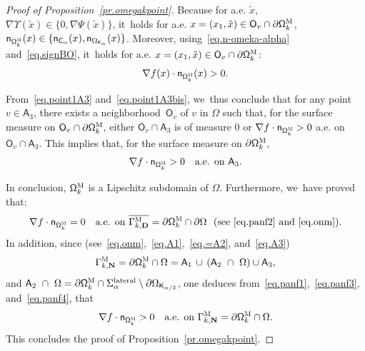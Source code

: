 \documentclass[10pt]{amsart}
\newcommand{\mbf}[1]{\mathbf{#1}}
\let\pa\partial
\theoremstyle{plain}
\theoremstyle{definition}
\begin{document}
\begin{proof}[Proof of Proposition~\ref{pr.omegakpoint}]
Because for a.e. $\tilde x$, $\nabla \Upsilon (\tilde x)\in \{0,\nabla \Psi(\tilde x)\}$, it~holds for a.e. $x=(x_1,\tilde x)\in \mathsf O_v\cap \pa \mathsf \Omega_k^{\textsc{M}}$, $\mathsf n_{\mathsf \Omega_k^{\textsc{M}}}(x)\in \{ \mathsf n_{ \mathsf C_\alpha }(x), \mathsf n_{ \Omega_{\mathsf K_\alpha} }(x)\}$.
Moreover, using~\eqref{eq.n-omeka-alpha} and~\eqref{eq.signBO}, it~holds for a.e. $x=(x_1,\tilde x)\in \mathsf O_v\cap \pa \mathsf \Omega_k^{\textsc{M}}$:
\begin{equation}\label{eq.point1A3bis}
\nabla f(x)\cdot \mathsf n_{\mathsf \Omega_k^{\textsc{M}}}(x)>0.
\end{equation}

From~\eqref{eq.point1A3} and~\eqref{eq.point1A3bis}, we~thus conclude
that for any point $v \in \mathsf A_3$, there exists a neighborhood~$\mathsf O_v$ of $v$ in $\Omega$ such that, for the surface measure on $\mathsf O_v\cap \pa \mathsf \Omega_k^{\textsc{M}} $, either $\mathsf O_v \cap \mathsf A_3$ is of measure $0$ or
$\nabla f\cdot \mathsf n_{ \mathsf \Omega_k^{\textsc{M}}}>0$
a.e. on $\mathsf O_v \cap \mathsf A_3$.
This implies that, for the surface measure on $\pa \mathsf \Omega_k^{\textsc{M}} $,
\begin{equation}\label{eq.panf4}
\nabla f\cdot \mathsf n_{ \mathsf \Omega_k^{\textsc{M}}}>0 \quad\text{a.e. on } \mathsf A_3.
\end{equation}

In conclusion, $\mathsf \Omega_k^{\textsc{M}}$ is a Lipschitz subdomain of $\Omega$. Furthermore, we~have proved that:
\[
\nabla f\cdot \mathsf n_{ \mathsf \Omega_k^{\textsc{M}}}=0\quad\text{a.e. on } \overline{\Gamma_{k,\mbf D}^{\textsc{M}} }=\pa \mathsf \Omega_k^{\textsc{M}}\cap \partial \Omega \ \text{ (see~\eqref{eq.panf2} and~\eqref{eq.onm})}.
\]
In addition, since (see~\eqref{eq.onm},~\eqref{eq.A1},~\eqref {eq.=A2}, and~\eqref{eq.A3})
\[
\Gamma_{k,\mbf N}^{\textsc{M}}=\pa \mathsf \Omega_k^{\textsc{M}}\cap \Omega= \mathsf A_1\, \cup\, (\mathsf A_2\ \cap \ \Omega) \cup \mathsf A_3,
\]
and $\mathsf A_2\ \cap \ \Omega=\pa \mathsf \Omega_k^{\textsc{M}}
\cap {\Sigma_\alpha^{\textup{lateral}} }\setminus \partial \Omega_{\mathsf
K_{\alpha/2}} $, one deduces from~\eqref{eq.panf1},~\eqref{eq.panf3}, and~\eqref{eq.panf4}, that
\[
\nabla f\cdot \mathsf n_{ \mathsf \Omega_k^{\textsc{M}}}>0\quad\text{a.e. on } \Gamma_{k,\mbf N}^{\textsc{M}}=\pa \mathsf \Omega_k^{\textsc{M}}\cap \Omega.
\]
This concludes the proof of Proposition~\ref{pr.omegakpoint}.
\end{proof}
\end{document}

